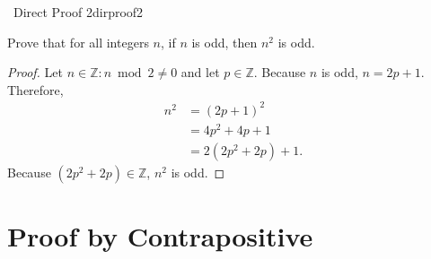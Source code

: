     \begin{exercise}{\Difficulty\,\Difficulty\,\,Direct Proof 2}{dirproof2}
    
    Prove that for all integers \(n\), if \(n\) is odd, then \(n^2\) is odd.
    
    \begin{proof}
        Let \(n\in\mathbb{Z}:n\bmod2\neq0\) and let \(p\in\mathbb{Z}\). Because \(n\) is odd, \(n=2p+1\). Therefore,
        \begin{align*}
            n^2&=(2p+1)^2 \\
            &=4p^2+4p+1 \\
            &=2(2p^2+2p)+1.
        \end{align*}
        Because \((2p^2+2p)\in\mathbb{Z}\), \(n^2\) is odd.
    \end{proof}
    
    \end{exercise}

\section{Proof by Contrapositive}

